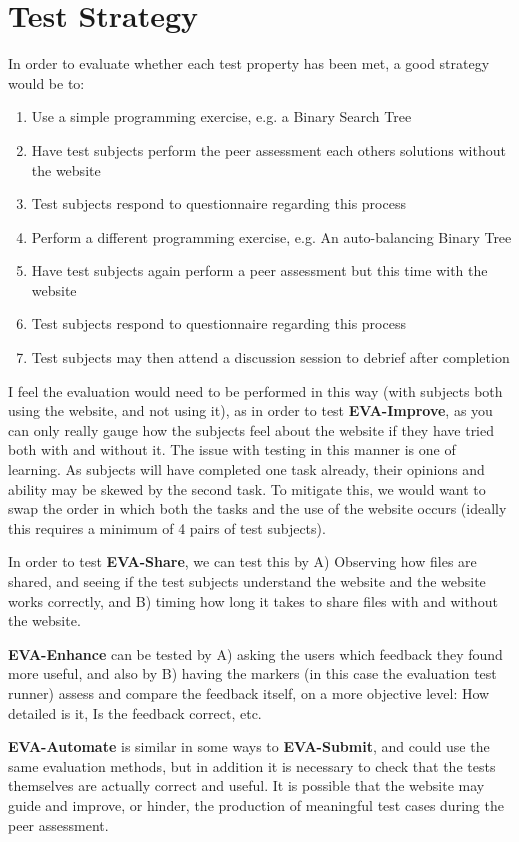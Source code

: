 \documentclass[a4paper,11pt]{report}
\begin{document}
\section{Test Strategy}
In order to evaluate whether each test property has been met, a good strategy would be to:
\begin{enumerate}
 \item Use a simple programming exercise, e.g. a Binary Search Tree
 \item Have test subjects perform the peer assessment each others solutions without the website
 \item Test subjects respond to questionnaire regarding this process
 \item Perform a different programming exercise, e.g. An auto-balancing Binary Tree
 \item Have test subjects again perform a peer assessment but this time with the website
 \item Test subjects respond to questionnaire regarding this process
 \item Test subjects may then attend a discussion session to debrief after completion
\end{enumerate}
I feel the evaluation would need to be performed in this way (with subjects both using the website, and not using it), as in order to test \textbf{EVA-Improve}, as you can only really gauge how the subjects feel about the website if they have tried both with and without it. The issue with testing in this manner is one of learning. As subjects will have completed one task already, their opinions and ability may be skewed by the second task. To mitigate this, we would want to swap the order in which both the tasks and the use of the website occurs (ideally this requires a minimum of 4 pairs of test subjects).\par
In order to test \textbf{EVA-Share}, we can test this by A) Observing how files are shared, and seeing if the test subjects understand the website and the website works correctly, and B) timing how long it takes to share files with and without the website.\par
\textbf{EVA-Enhance} can be tested by A) asking the users which feedback they found more useful, and also by B) having the markers (in this case the evaluation test runner) assess and compare the feedback itself, on a more objective level: How detailed is it, Is the feedback correct, etc.\par
\textbf{EVA-Automate} is similar in some ways to \textbf{EVA-Submit}, and could use the same evaluation methods, but in addition it is necessary to check that the tests themselves are actually correct and useful. It is possible that the website may guide and improve, or hinder, the production of meaningful test cases during the peer assessment.\par
\end{document}
